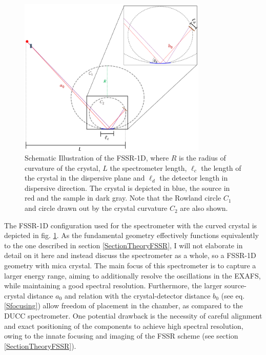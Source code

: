 \begin{figure}[H]
	\centering
	\includegraphics[width = 0.8\textwidth]{Diagrams/FSSRRealScheme.PNG}
	\caption{Schematic Illustration of the FSSR-1D, 
		where $R$ is the radius of curvature of the 
		crystal, $L$ the spectrometer length, $\ell_{c}$ 
		the length of the crystal in the dispersive plane 
		and $\ell_d$ the detector length in dispersive 
		direction. The crystal is depicted in blue, the 
		source in red and the sample in dark gray. Note 
		that the Rowland circle $C_1$ and circle drawn out by 
		the crystal curvature $C_2$ are also shown.}
	\label{realFSSRScheme}
\end{figure}

The FSSR-1D configuration used for the spectrometer with the curved crystal is 
depicted in fig. 
\ref{realFSSRScheme}. As the fundamental geometry 
effectively functions 
equivalently to the one 
described in section \ref{SectionTheoryFSSR}, I will 
not elaborate in detail on it here and instead discuss the spectrometer 
as a whole, 
so a FSSR-1D geometry with mica crystal. The main focus of this 
spectrometer is to capture a 
larger energy range, aiming to additionally resolve the oscillations in the 
EXAFS, 
while maintaining a good spectral resolution. 
Furthermore, the larger 
source-crystal distance $a_0$ and relation with the crystal-detector 
distance $b_0$ (see eq. \ref{Sfocusing}) allow freedom 
of placement in the chamber, as compared to the DUCC spectrometer. 
One 
potential drawback is 
the necessity of careful alignment and exact positioning 
of the components to 
achieve high spectral resolution, owing to the innate 
focusing and imaging of 
the FSSR scheme (see section \ref{SectionTheoryFSSR}). 

